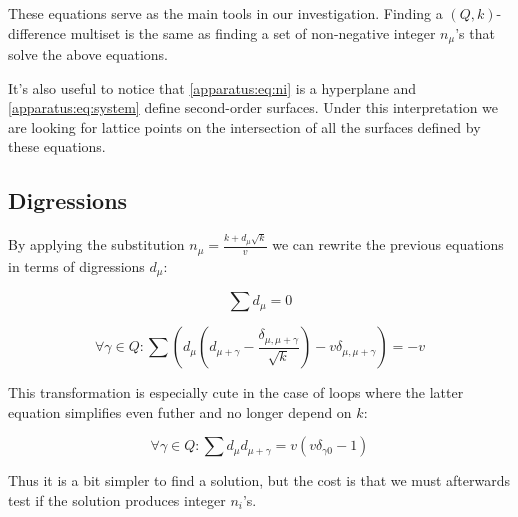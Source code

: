     These equations serve as the main tools in our investigation. Finding a $(Q,k)$-difference multiset is the same as finding a set of non-negative integer $n_\mu$'s that solve the above equations. 
    
    It's also useful to notice that \eqref{apparatus:eq:ni} is a hyperplane and \eqref{apparatus:eq:system} define second-order surfaces. Under this interpretation we are looking for lattice points on the intersection of all the surfaces defined by these equations.

\subsection{Digressions}
\label{sec:digressions}
    By applying the substitution $n_\mu=\frac{k+d_\mu \sqrt k}v$ we can rewrite the previous equations in terms of digressions $d_\mu$:
    
    \begin{equation}
        \label{apparatus:eq:di}
        \sum {d_\mu} = 0
    \end{equation}
    
    \begin{equation}
        \label{apparatus:eq:dsystem_general}
        \forall \gamma \in Q \colon \sum (d_\mu (d_{\mu+\gamma}-\frac{\delta_{\mu,\mu+\gamma}}{\sqrt k})-v\delta_{\mu,\mu+\gamma}) = -v
    \end{equation}
    
    This transformation is especially cute in the case of loops where the latter equation simplifies even futher and no longer depend on $k$:
    
    \begin{equation}
        \label{apparatus:eq:dsystem}
        \forall \gamma \in Q \colon \sum d_\mu d_{\mu+\gamma} = v (v \delta_{\gamma 0}-1)
    \end{equation}
    
    Thus it is a bit simpler to find a solution, but the cost is that we must afterwards test if the solution produces integer $n_i$'s.
    
